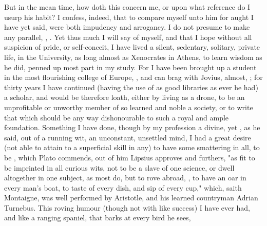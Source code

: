 But in the mean time, how doth this concern me, or upon what reference do I
usurp his habit? I confess, indeed, that to compare myself unto him for aught I
have yet said, were both impudency and arrogancy. I do not presume to make any
parallel, , .
Yet thus much I will say of myself, and that I hope without all suspicion of
pride, or self-conceit, I have lived a silent, sedentary, solitary, private
life,  in the University, as long
almost as Xenocrates in Athens, 
to learn wisdom as he did, penned up most part in my study. For I have been
brought up a student in the most flourishing college of Europe,
, and can brag with
Jovius, almost, ; for thirty years I have continued (having the use of as good
libraries as ever he had) a scholar, and would be therefore
loath, either by living as a drone, to be an unprofitable or unworthy member of
so learned and noble a society, or to write that which should be any way
dishonourable to such a royal and ample foundation. Something I have done,
though by my profession a divine, yet , as
he said, out of a running wit, an unconstant, unsettled
mind, I had a great desire (not able to attain to a superficial skill in any)
to have some smattering in all, to be , which Plato commends, out of
him Lipsius approves and furthers, "as fit to be imprinted
in all curious wits, not to be a slave of one science, or dwell altogether in
one subject, as most do, but to rove abroad, , to have an oar in every man's boat, to
taste of every dish, and sip of every cup," which, saith
Montaigne, was well performed by Aristotle, and his learned
countryman Adrian Turnebus. This roving humour (though not with like success) I
have ever had, and like a ranging spaniel, that barks at every bird he sees,
